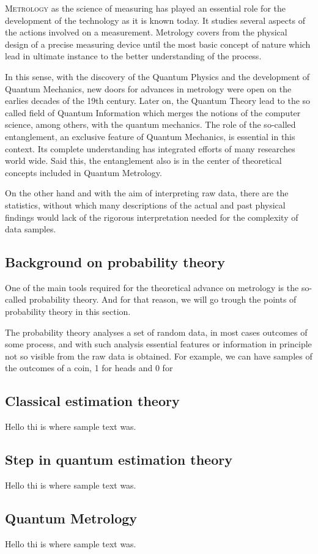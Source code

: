 
\lettrine[lines=2, findent=3pt,nindent=0pt]{M}{etrology} as the science of measuring has played an essential role for the development of the technology as it is  known today.
It studies several aspects of the actions involved on a measurement.
Metrology covers from the physical design of a precise measuring device until the most basic concept of nature which lead in ultimate instance to the better understanding of the process. 

In this sense, with the discovery of the Quantum Physics and the development of Quantum Mechanics, new doors for advances in metrology were open on the earlies decades of the 19th century.
Later on, the Quantum Theory lead to the so called field of Quantum Information which merges the notions of the computer science, among others, with the quantum mechanics.
The role of the so-called entanglement, an exclusive feature of Quantum Mechanics, is essential in this context.
Its complete understanding has integrated efforts of many researches world wide.
Said this, the entanglement also is in the center of theoretical concepts included in Quantum Metrology.

On the other hand and with the aim of interpreting raw data, there are the statistics, without which many descriptions of the actual and past physical findings would lack of the rigorous interpretation needed for the complexity of data samples.



\subsection{Background on probability theory}
One of the main tools required for the theoretical advance on metrology is the so-called probability theory.
And for that reason, we will go trough the points of probability theory in this section.

The probability theory analyses a set of random data, in most cases outcomes of some process, and with such analysis essential features or information in principle not so visible from the raw data is obtained. For example, we can have samples of the outcomes of a coin, 1 for heads and 0 for


\subsection{Classical estimation theory}
Hello thi is where sample text was.

\subsection{Step in quantum estimation theory}
Hello thi is where sample text was.

\subsection{Quantum Metrology}
Hello thi is where sample text was.

